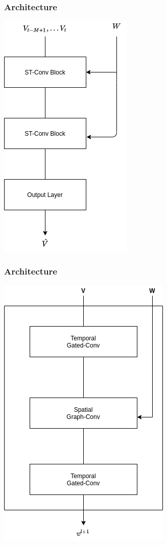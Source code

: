 \documentclass{beamer}
\begin{document}
\begin{frame}
  \frametitle{Architecture}
  \centering
  \includegraphics[height=\textheight]{img/blocks.png}
\end{frame}
\begin{frame}
  \frametitle{Architecture}
  \centering
  \includegraphics[height=\textheight]{img/inner-blocks.png}
\end{frame}
\end{document}
